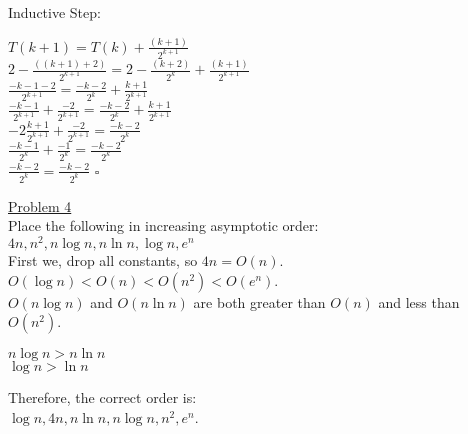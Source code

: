 \documentclass[a4paper,12pt]{article}
\begin{document}
Inductive Step:
\begin{center}
$T(k+1) = T(k) + \frac{(k+1)}{2^{k+1}}$\\
$2 - \frac{((k+1)+2)}{2^{k+1}} = 2 - \frac{(k+2)}{2^k} + \frac{(k+1)}{2^{k+1}}$\\
$\frac{-k-1-2}{2^{k+1}} = \frac{-k-2}{2^k} + \frac{k+1}{2^{k+1}}$\\
$\frac{-k-1}{2^{k+1}} + \frac{-2}{2^{k+1}} = \frac{-k-2}{2^k} + \frac{k+1}{2^{k+1}}$\\
$-2\frac{k+1}{2^{k+1}} + \frac{-2}{2^{k+1}} = \frac{-k-2}{2^k}$\\
$\frac{-k-1}{2^k} + \frac{-1}{2^k} = \frac{-k-2}{2^k}$\\
$\frac{-k-2}{2^k} = \frac{-k-2}{2^k}$ $\square$\\
\end{center}

\underline{Problem 4}\\
\indent Place the following in increasing asymptotic order:\\
\indent \indent $4n, n^2, n\log{n}, n\ln{n}, \log{n}, e^n$\\

First we, drop all constants, so $4n = O(n)$. \\
\indent $O(\log{n}) < O(n) < O(n^2) < O(e^n)$.\\
\indent $O(n\log{n})$ and $O(n\ln{n})$ are both greater than $O(n)$ and less than $O(n^2)$.
 \begin{center}
$ n\log{n} > n\ln{n}$\\
$\log{n} > \ln{n}$\\
 \end{center}

 
Therefore, the correct order is:\\
\indent \indent $ \log{n}, 4n, n\ln{n}, n\log{n}, n^2, e^n$.\\
\end{document}
